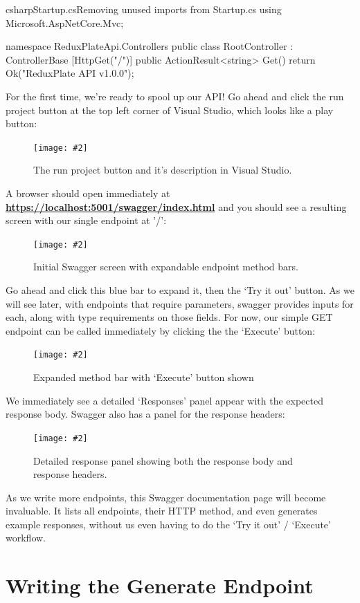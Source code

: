 \documentclass[paper=6in:9in,pagesize=pdftex,headinclude=on,footinclude=on,12pt,twoside]{scrbook}
\newcommand{\link}[2]{\textbf{\textcolor{monokaiPink}{\href{#2}{#1}}}}
\newcommand{\standardfigure}[3]{\begin{figure}[H]\begin{center}\texttt{[image: \#2]}\caption{#3}\label{fig:#2}\end{center}\end{figure}}
\begin{document}
\begin{codeInput}{csharp}{Startup.cs}{Removing unused imports from Startup.cs}
using Microsoft.AspNetCore.Mvc;

namespace ReduxPlateApi.Controllers
{
    public class RootController : ControllerBase
    {
        [HttpGet("/")]
        public ActionResult<string> Get()
        {
            return Ok("ReduxPlate API v1.0.0");
        }
    }
}  
\end{codeInput}

For the first time, we're ready to spool up our API! Go ahead and click the run project button at the top left corner of Visual Studio, which looks like a play button:

\standardfigure{\textwidth}{backend/run-project-button}{The run project button and it's description in Visual Studio.}

A browser should open immediately at \link{https://localhost:5001/swagger/index.html}{https://localhost:5001/swagger/index.html} and you should see a resulting screen with our single endpoint at '/':

\standardfigure{\textwidth}{backend/swagger-initial}{Initial Swagger screen with expandable endpoint method bars.}

Go ahead and click this blue bar to expand it, then the `Try it out' button. As we will see later, with endpoints that require parameters, swagger provides inputs for each, along with type requirements on those fields. For now, our simple GET endpoint can be called immediately by clicking the the `Execute' button:

\standardfigure{\textwidth}{backend/swagger-expanded}{Expanded method bar with `Execute' button shown}

We immediately see a detailed `Responses' panel appear with the expected response body. Swagger also has a panel for the response headers:

\standardfigure{\textwidth}{backend/swagger-response-panel}{Detailed response panel showing both the response body and response headers.}

As we write more endpoints, this Swagger documentation page will become invaluable. It lists all endpoints, their HTTP method, and even generates example responses, without us even having to do the `Try it out' / `Execute' workflow.

\section{Writing the Generate Endpoint}
\end{document}
